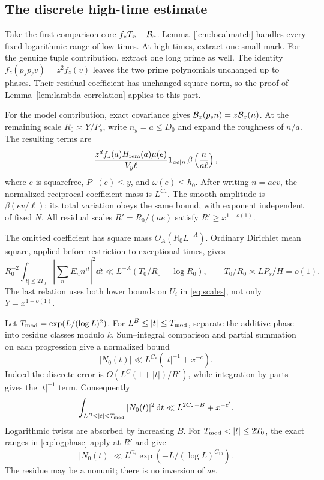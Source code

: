 \subsection{The discrete high-time estimate}

Take the first comparison core $f_zT_x-\mathcal B_x$. Lemma~\ref{lem:localmatch}
handles every fixed logarithmic range of low times. At high times,
extract one small mark. For the genuine tuple contribution, extract
one long prime as well. The identity
$f_z(p_sp_\ell v)=z^2f_z(v)$ leaves the two prime polynomials
unchanged up to phases. Their residual coefficient has unchanged
square norm, so the proof of Lemma~\ref{lem:lambda-correlation}
applies to this part.

For the model contribution, exact covariance gives
$\mathcal B_x(p_sn)=z\mathcal B_x(n)$. At the remaining scale
$R_0\asymp Y/P_s$, write $n_y=a\leq D_0$ and expand the roughness
of $n/a$. The resulting terms are
\begin{equation}\label{eq:discretemodel}
 \frac{z^df_z(a)H_{\rm rem}(a)\mu(e)}{V_y\ell}
       \mathbf 1_{ae\mid n}\,\beta\left(\frac n{a\ell}\right),
\end{equation}
where $e$ is squarefree, $P^+(e)\leq y$, and $\omega(e)\leq h_0$.
After writing $n=aev$, the normalized reciprocal coefficient mass
is $L^{C_*}$. The smooth amplitude is $\beta(ev/\ell)$; its total
variation obeys the same bound, with exponent independent of fixed $N$.
All residual scales $R'=R_0/(ae)$ satisfy $R'\geq x^{1-o(1)}$.

The omitted coefficient has square mass $O_A(R_0L^{-A})$.
Ordinary Dirichlet mean square, applied before restriction to
exceptional times, gives
\begin{equation}\label{eq:modelerror}
 R_0^{-2}\int_{|t|\leq2T_0}\left|\sum_n E_n n^{it}\right|^2\dd t
 \ll L^{-A}(T_0/R_0+\log R_0),\qquad
 T_0/R_0\asymp LP_s/H=o(1).
\end{equation}
The last relation uses both lower bounds on $U_i$ in
\eqref{eq:scales}, not only $Y=x^{1+o(1)}$.

Let $T_{\rm mod}=\exp(L/(\log L)^2)$. For
$L^B\leq|t|\leq T_{\rm mod}$, separate the additive phase into
residue classes modulo $k$. Sum--integral comparison and partial
summation on each progression give a normalized bound
\[
 |N_0(t)|\ll L^{C_*}(|t|^{-1}+x^{-c}).
\]
Indeed the discrete error is $O(L^C(1+|t|)/R')$, while integration
by parts gives the $|t|^{-1}$ term. Consequently
\begin{equation}\label{eq:moderate}
 \int_{L^B\leq|t|\leq T_{\rm mod}}|N_0(t)|^2\,\mathrm d t
 \ll L^{2C_*-B}+x^{-c'}.
\end{equation}
Logarithmic twists are absorbed by increasing $B$.
For $T_{\rm mod}<|t|\leq2T_0$, the exact ranges in
\eqref{eq:logphase} apply at $R'$ and give
\begin{equation}\label{eq:highmodel}
 |N_0(t)|\ll L^{C_*}\exp(-L/(\log L)^{C_{19}}).
\end{equation}
The residue may be a nonunit; there is no inversion of $ae$.

